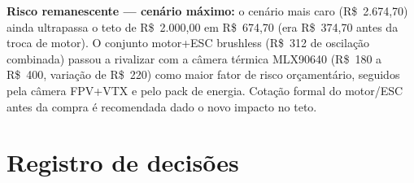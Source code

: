 \documentclass[11pt,a4paper]{article}
\newcommand{\aviso}[2]{%
  \par\noindent\colorbox{voltamberbg}{%
    \begin{minipage}{\dimexpr\linewidth-2\fboxsep\relax}
      \vspace{0.3em}
      \textcolor{voltamber}{\textbf{#1}} #2
      \vspace{0.3em}
    \end{minipage}%
  }\par\vspace{1em}
}
\begin{document}
\aviso{Risco remanescente — cenário máximo:}{o cenário mais caro (R\$~2.674,70) ainda ultrapassa o teto de R\$~2.000,00 em R\$~674,70 (era R\$~374,70 antes da troca de motor). O conjunto motor+ESC brushless (R\$~312 de oscilação combinada) passou a rivalizar com a câmera térmica MLX90640 (R\$~180 a R\$~400, variação de R\$~220) como maior fator de risco orçamentário, seguidos pela câmera FPV+VTX e pelo pack de energia. Cotação formal do motor/ESC antes da compra é recomendada dado o novo impacto no teto.}

\section{Registro de decisões}
\end{document}
